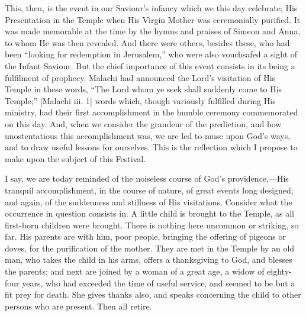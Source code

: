 This, then, is the event in our Saviour's infancy which we this day
celebrate; His Presentation in the Temple when His Virgin Mother was
ceremonially purified. It was made memorable at the time by the hymns
and praises of Simeon and Anna, to whom He was then revealed. And there
were others, besides these, who had been ``looking for redemption in
Jerusalem,'' who were also vouchsafed a sight of the Infant Saviour.
But the chief importance of this event consists in its being a
fulfilment of prophecy. Malachi had announced the Lord's visitation of
His Temple in these words, ``The Lord whom ye seek shall suddenly
come to His Temple;'' [Malachi iii. 1] words which, though variously
fulfilled during His ministry, had their first accomplishment in the
humble ceremony commemorated on this day. And, when we consider the
grandeur of the prediction, and how unostentatious this accomplishment
was, we are led to muse upon God's ways, and to draw useful lessons for
ourselves. This is the reflection which I propose to make upon the
subject of this Festival.

I say, we are today reminded of the noiseless course of God's
providence,—His tranquil accomplishment, in the course of nature, of
great events long designed; and again, of the suddenness and stillness
of His visitations. Consider what the occurrence in question consists
in. A little child is brought to the Temple, as all first-born children
were brought. There is nothing here uncommon or striking, so far. His
parents are with him, poor people, bringing the offering of pigeons or
doves, for the purification of the mother. They are met in the Temple by
an old man, who takes the child in his arms, offers a thanksgiving to
God, and blesses the parents; and next are joined by a woman of a great
age, a widow of eighty-four years, who had exceeded the time of useful
service, and seemed to be but a fit prey for death. She gives thanks
also, and speaks concerning the child to other persons who are present.
Then all retire.

